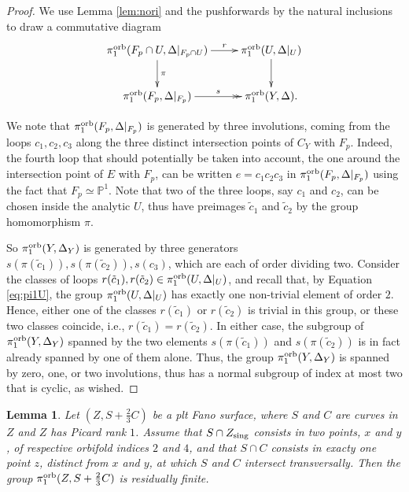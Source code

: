 \documentclass{amsart}
\newcommand{\pp}{\mathbb{P}}
\newtheorem{lemma}[theorem]{Lemma}
\theoremstyle{definition}
\theoremstyle{remark}
\numberwithin{equation}{section}
\begin{document}
\begin{proof}

We use Lemma \ref{lem:nori} and the pushforwards by the natural inclusions to draw a commutative diagram
\[
\xymatrix{
\pi_1^{\rm orb}(F_p\cap U,\Delta|_{F_p\cap U})\ar[r]^-{r}\ar[d]^-{\pi} & 
\pi_1^{\rm orb}(U,\Delta|_{U}) \ar[d]\\
\pi_1^{\rm orb}(F_p,\Delta|_{F_p})\ar@{->>}[r]^-{s} &
\pi_1^{\rm orb}(Y,\Delta).
}
\]

We note that $\pi_1^{\rm orb}(F_p,\Delta|_{F_p})$ is generated by three involutions, coming from the loops $c_1,c_2,c_3$ along the three distinct intersection points of $C_Y$ with $F_p$. Indeed, the fourth loop that should potentially be taken into account, the one around the intersection point of $E$ with $F_p$, can be written $e=c_1c_2c_3$ in $\pi_1^{\rm orb}(F_p,\Delta|_{F_p})$ using the fact that $F_p\simeq \pp^1$. Note that two of the three loops, say $c_1$ and $c_2$, can be chosen inside the analytic $U$, thus have preimages $\tilde{c}_1$ and $\tilde{c}_2$ by the group homomorphism $\pi$.

So $\pi_1^{\rm orb}(Y,\Delta_Y)$ is generated by three generators $s(\pi(\tilde{c}_1)),s(\pi(\tilde{c}_2)),s(c_3)$, which are each of order dividing two. Consider the classes of loops $r(\tilde{c}_1),r(\tilde{c}_2)\in \pi_1^{\rm orb}(U,\Delta|_{U})$, and recall that, by Equation \eqref{eq:pi1U}, the group $\pi_1^{\rm orb}(U,\Delta|_{U})$ has exactly one non-trivial element of order $2$. Hence, either one of the classes $r(\tilde{c}_1)$ or $r(\tilde{c}_2)$ is trivial in this group, or these two classes coincide, i.e., $r(\tilde{c}_1)=r(\tilde{c}_2)$. In either case, the subgroup of $\pi_1^{\rm orb}(Y,\Delta_Y)$ spanned by the two elements $s(\pi(\tilde{c}_1))$ and $s(\pi(\tilde{c}_2))$ is in fact already spanned by one of them alone. Thus, the group $\pi_1^{\rm orb}(Y,\Delta_Y)$ is spanned by zero, one, or two involutions, thus has a normal subgroup of index at most two that is cyclic, as wished.
\end{proof}



\begin{lemma}\label{lem:t2-t4}
Let $(Z,S+\frac{2}{3}C)$ be a plt Fano surface, where  $S$ and $C$ are curves in $Z$ and $Z$ has Picard rank $1$. Assume that $S\cap Z_{\rm sing}$ consists in two points, $x$ and $y$, of respective orbifold indices $2$ and $4$, and that $S\cap C$ consists in exacty one point $z$, distinct from $x$ and $y$, at which $S$ and $C$ intersect transversally.
Then the group 
$\pi_1^{\rm orb}(Z,S+\frac{2}{3}C)$ is residually finite.
\end{lemma}
\end{document}
